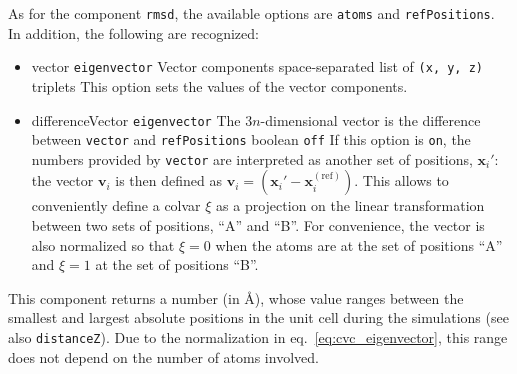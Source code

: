 As for the component \texttt{rmsd}, the available options are \texttt{atoms} and \texttt{refPositions}.
In addition, the following are recognized:
\begin{itemize}

\item %
  \key
    {vector}{%
    \texttt{eigenvector}}{%
    Vector components}{%
    space-separated list of \texttt{(x, y, z)} triplets}{%
    This option  sets the values of the vector components.}


\item %
  \keydef
    {differenceVector}{%
    \texttt{eigenvector}}{%
    The $3n$-dimensional vector is the difference between \texttt{vector} and \texttt{refPositions}}{%
    boolean}{%
    \texttt{off}}{%
    If this option is \texttt{on}, the numbers provided by \texttt{vector} are interpreted as another set of positions, $\mathbf{x}_{i}'$: the vector $\mathbf{v}_{i}$ is then defined as $\mathbf{v}_{i} = \left(\mathbf{x}_{i}' - \mathbf{x}_{i}^{\mathrm{(ref)}}\right)$.
This allows to conveniently define a colvar $\xi$ as a projection on the linear transformation between two sets of positions, ``A'' and ``B''.
For convenience, the vector is also normalized so that $\xi = 0$ when the atoms are at the set of positions ``A'' and $\xi = 1$ at the set of positions ``B''.
}

\end{itemize}
This component returns a number (in \AA), whose value ranges between
the smallest and largest absolute positions in the unit cell during
the simulations (see also \texttt{distanceZ}).  Due to the
normalization in eq.~\ref{eq:cvc_eigenvector}, this range does not
depend on the number of atoms involved.


